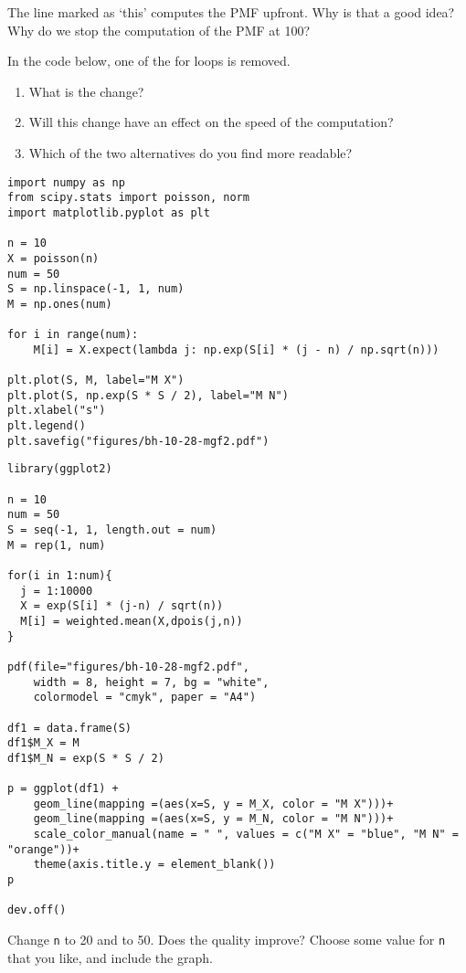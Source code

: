 \begin{exercise}
The line marked as `this' computes the PMF upfront. Why is that a good idea?
Why do we stop the computation of the PMF at 100?
\end{exercise}


\begin{exercise}
In the code below, one of the for loops is removed.
\begin{enumerate}
\item What is the change?
\item Will this change have an effect on the speed of the computation?
\item Which of the two alternatives do you find more readable?
\end{enumerate}
\end{exercise}


\begin{verbatim}
import numpy as np
from scipy.stats import poisson, norm
import matplotlib.pyplot as plt

n = 10
X = poisson(n)
num = 50
S = np.linspace(-1, 1, num)
M = np.ones(num)

for i in range(num):
    M[i] = X.expect(lambda j: np.exp(S[i] * (j - n) / np.sqrt(n)))

plt.plot(S, M, label="M X")
plt.plot(S, np.exp(S * S / 2), label="M N")
plt.xlabel("s")
plt.legend()
plt.savefig("figures/bh-10-28-mgf2.pdf")
\end{verbatim}

\begin{verbatim}
library(ggplot2)

n = 10
num = 50
S = seq(-1, 1, length.out = num)
M = rep(1, num)

for(i in 1:num){
  j = 1:10000
  X = exp(S[i] * (j-n) / sqrt(n))
  M[i] = weighted.mean(X,dpois(j,n))
}

pdf(file="figures/bh-10-28-mgf2.pdf",
    width = 8, height = 7, bg = "white",
    colormodel = "cmyk", paper = "A4")

df1 = data.frame(S)
df1$M_X = M
df1$M_N = exp(S * S / 2)

p = ggplot(df1) +
    geom_line(mapping =(aes(x=S, y = M_X, color = "M X")))+
    geom_line(mapping =(aes(x=S, y = M_N, color = "M N")))+
    scale_color_manual(name = " ", values = c("M X" = "blue", "M N" = "orange"))+
    theme(axis.title.y = element_blank())
p

dev.off()
\end{verbatim}

\begin{exercise}
Change \texttt{n} to 20 and to 50. Does the quality improve? Choose some value for \texttt{n} that you like, and include the graph.
\end{exercise}



